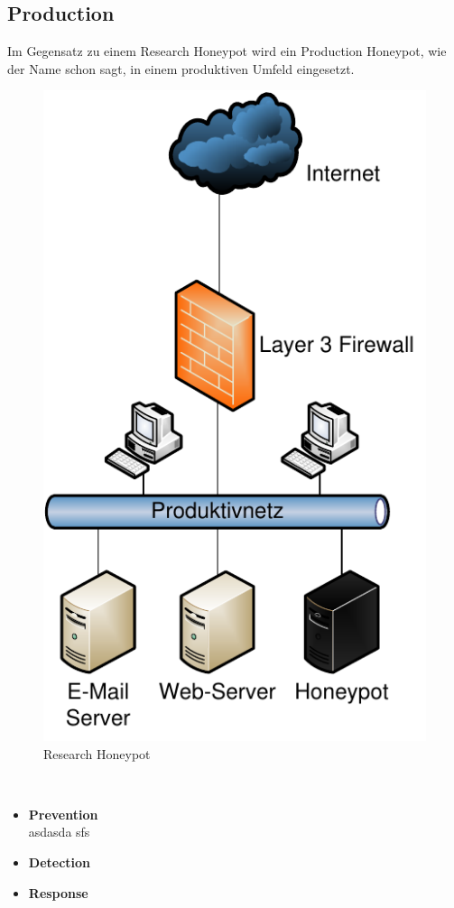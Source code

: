 \subsection{Production}

Im Gegensatz zu einem Research Honeypot wird ein Production Honeypot, wie der Name schon sagt, in einem produktiven Umfeld eingesetzt. 
\\
\begin{figure}[ht]
    \centering\includegraphics[scale=0.6]{Bilder/produktiv.pdf}
  \caption{Research Honeypot}
  \label{hnet:geni}
\end{figure}
\\
\begin{itemize}							%
\item{\textbf{Prevention}} \\ asdasda sfs				
\item{\textbf{Detection}} \\
\item{\textbf{Response}} \\
\end{itemize}
